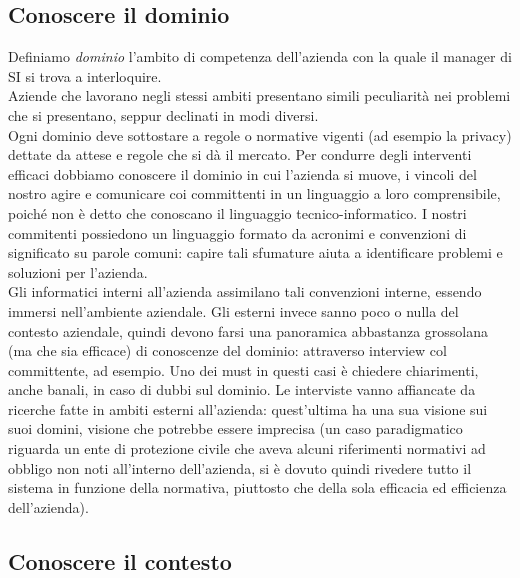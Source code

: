 \subsection{Conoscere il dominio}
Definiamo \textit{dominio} l'ambito di competenza dell'azienda con la quale il manager di SI si trova a interloquire. \\
Aziende che lavorano negli stessi ambiti presentano simili peculiarit\`a  nei pro\-blemi che si presentano, seppur declinati in modi diversi. \\
Ogni dominio deve sottostare a regole o normative vigenti (ad esempio la privacy) dettate da attese e regole che si d\`a il mercato. Per condurre degli interventi efficaci dobbiamo conoscere il dominio in cui l'azienda si muove, i vincoli del nostro agire e comunicare coi committenti in un linguaggio a loro comprensibile, poich\'e non \`e detto che conoscano il linguaggio tecnico-informatico.
I nostri commitenti possiedono un linguaggio formato da acronimi e convenzioni di  signi\-ficato su parole comuni: capire tali sfumature aiuta a identificare problemi e soluzioni per l'azienda. \\
Gli informatici interni all'azienda assimilano tali convenzioni interne, essendo immersi nell'ambiente aziendale. Gli esterni invece sanno poco o nulla del contesto aziendale, quindi devono farsi una panoramica abbastanza grossolana (ma che sia efficace) di conoscenze del dominio: attraverso interview col committente, ad esempio. Uno dei must in questi casi \`e chiedere chiarimenti, anche banali, in caso di dubbi sul dominio. Le interviste vanno  affiancate da ricerche fatte in ambiti esterni all'azienda:  quest'ultima ha una sua visione sui suoi domini, visione che potrebbe  essere imprecisa (un caso paradigmatico riguarda un ente di protezione civile che aveva alcuni riferimenti normativi ad obbligo non noti all'interno dell'azienda, si \`e dovuto quindi rivedere tutto  il sistema in funzione della normativa, piuttosto che della sola  efficacia ed efficienza dell'azienda).

\subsection{Conoscere il contesto}

